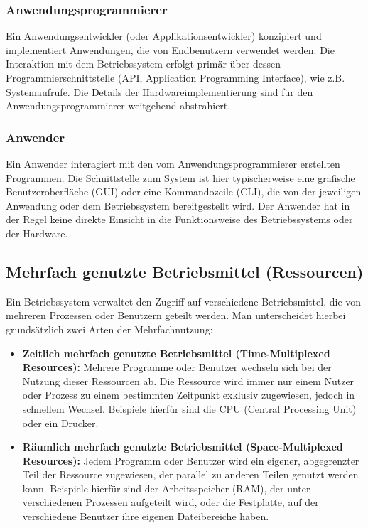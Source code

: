 \subsubsection{Anwendungsprogrammierer}
Ein Anwendungsentwickler (oder Applikationsentwickler) konzipiert und implementiert Anwendungen, die von Endbenutzern verwendet werden. Die Interaktion mit dem Betriebssystem erfolgt primär über dessen Programmierschnittstelle (API, Application Programming Interface), wie z.B. Systemaufrufe. Die Details der Hardwareimplementierung sind für den Anwendungsprogrammierer weitgehend abstrahiert.

\subsubsection{Anwender}
Ein Anwender interagiert mit den vom Anwendungsprogrammierer erstellten Programmen. Die Schnittstelle zum System ist hier typischerweise eine grafische Benutzeroberfläche (GUI) oder eine Kommandozeile (CLI), die von der jeweiligen Anwendung oder dem Betriebssystem bereitgestellt wird. Der Anwender hat in der Regel keine direkte Einsicht in die Funktionsweise des Betriebssystems oder der Hardware.

\subsection{Mehrfach genutzte Betriebsmittel (Ressourcen)}

Ein Betriebssystem verwaltet den Zugriff auf verschiedene Betriebsmittel, die von mehreren Prozessen oder Benutzern geteilt werden. Man unterscheidet hierbei grundsätzlich zwei Arten der Mehrfachnutzung:

\begin{itemize}
\item \textbf{Zeitlich mehrfach genutzte Betriebsmittel (Time-Multiplexed Resources):} Mehrere Programme oder Benutzer wechseln sich bei der Nutzung dieser Ressourcen ab. Die Ressource wird immer nur einem Nutzer oder Prozess zu einem bestimmten Zeitpunkt exklusiv zugewiesen, jedoch in schnellem Wechsel. Beispiele hierfür sind die CPU (Central Processing Unit) oder ein Drucker.
\item \textbf{Räumlich mehrfach genutzte Betriebsmittel (Space-Multiplexed Resources):} Jedem Programm oder Benutzer wird ein eigener, abgegrenzter Teil der Ressource zugewiesen, der parallel zu anderen Teilen genutzt werden kann. Beispiele hierfür sind der Arbeitsspeicher (RAM), der unter verschiedenen Prozessen aufgeteilt wird, oder die Festplatte, auf der verschiedene Benutzer ihre eigenen Dateibereiche haben.
\end{itemize}

